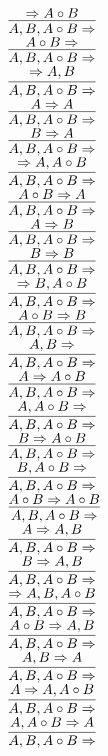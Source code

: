 \documentclass[11pt]{article}
\begin{document}
\begin{center}
\bigskip
\\$\infer{A, B, A\circ B\Rightarrow }{\Rightarrow A\circ B}$
\bigskip
\\$\infer{A, B, A\circ B\Rightarrow }{A\circ B\Rightarrow }$
\bigskip
\\$\infer{A, B, A\circ B\Rightarrow }{\Rightarrow A, B}$
\bigskip
\\$\infer{A, B, A\circ B\Rightarrow }{A\Rightarrow A}$
\bigskip
\\$\infer{A, B, A\circ B\Rightarrow }{B\Rightarrow A}$
\bigskip
\\$\infer{A, B, A\circ B\Rightarrow }{\Rightarrow A, A\circ B}$
\bigskip
\\$\infer{A, B, A\circ B\Rightarrow }{A\circ B\Rightarrow A}$
\bigskip
\\$\infer{A, B, A\circ B\Rightarrow }{A\Rightarrow B}$
\bigskip
\\$\infer{A, B, A\circ B\Rightarrow }{B\Rightarrow B}$
\bigskip
\\$\infer{A, B, A\circ B\Rightarrow }{\Rightarrow B, A\circ B}$
\bigskip
\\$\infer{A, B, A\circ B\Rightarrow }{A\circ B\Rightarrow B}$
\bigskip
\\$\infer{A, B, A\circ B\Rightarrow }{A, B\Rightarrow }$
\bigskip
\\$\infer{A, B, A\circ B\Rightarrow }{A\Rightarrow A\circ B}$
\bigskip
\\$\infer{A, B, A\circ B\Rightarrow }{A, A\circ B\Rightarrow }$
\bigskip
\\$\infer{A, B, A\circ B\Rightarrow }{B\Rightarrow A\circ B}$
\bigskip
\\$\infer{A, B, A\circ B\Rightarrow }{B, A\circ B\Rightarrow }$
\bigskip
\\$\infer{A, B, A\circ B\Rightarrow }{A\circ B\Rightarrow A\circ B}$
\bigskip
\\$\infer{A, B, A\circ B\Rightarrow }{A\Rightarrow A, B}$
\bigskip
\\$\infer{A, B, A\circ B\Rightarrow }{B\Rightarrow A, B}$
\bigskip
\\$\infer{A, B, A\circ B\Rightarrow }{\Rightarrow A, B, A\circ B}$
\bigskip
\\$\infer{A, B, A\circ B\Rightarrow }{A\circ B\Rightarrow A, B}$
\bigskip
\\$\infer{A, B, A\circ B\Rightarrow }{A, B\Rightarrow A}$
\bigskip
\\$\infer{A, B, A\circ B\Rightarrow }{A\Rightarrow A, A\circ B}$
\bigskip
\\$\infer{A, B, A\circ B\Rightarrow }{A, A\circ B\Rightarrow A}$

\end{center}
\end{document}
